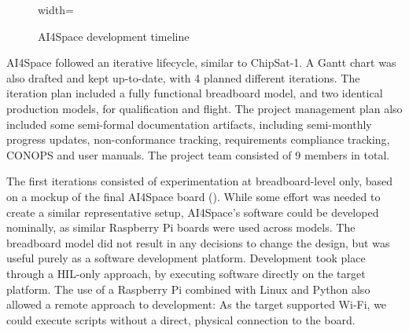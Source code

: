 \documentclass[a4paper,nobib,justified,final]{tufte-book}
\begin{document}
\begin{figure}
\begin{adjustbox}{width=\textwidth}
\end{adjustbox}
\caption{AI4Space development timeline}
\label{fig:c_ai4space_timeline}
\end{figure}

AI4Space followed an iterative lifecycle, similar to ChipSat-1. A Gantt chart was also drafted and kept up-to-date, with 4 planned different iterations. The iteration plan included a fully functional breadboard model, and two identical production models, for qualification and flight. The project management plan also included some semi-formal documentation artifacts, including semi-monthly progress updates, non-conformance tracking, requirements compliance tracking, \ac{CONOPS} and user manuals. The project team consisted of 9 members in total.

The first iterations consisted of experimentation at breadboard-level only, based on a mockup of the final AI4Space board (). While some effort was needed to create a similar representative setup, AI4Space's software could be developed nominally, as similar Raspberry Pi boards were used across models. The breadboard model did not result in any decisions to change the design, but was useful purely as a software development platform. Development took place through a \acs{HIL}-only approach, by executing software directly on the target platform. The use of a Raspberry Pi combined with Linux and Python also allowed a remote approach to development: As the target supported Wi-Fi, we could execute scripts without a direct, physical connection to the board.
\end{document}

